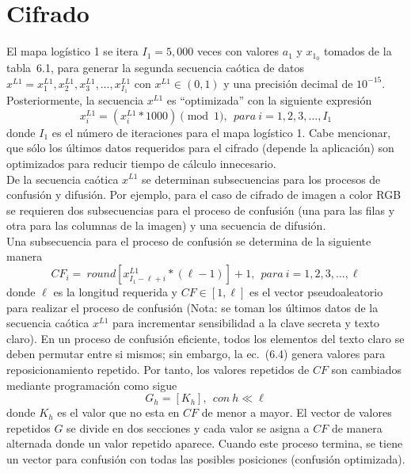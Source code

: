 \section{Cifrado}
El mapa logístico 1 se itera $I_{1}=5,000$ veces con valores $a_{1}$ y $x_{1_{0}}$ tomados de la tabla~6.1, para generar la segunda secuencia caótica de datos $x^{L1}={x_{1}^{L1},x_{2}^{L1},x_{3}^{L1},\ldots ,x_{I_{1}}^{L1}}$ con $x^{L1}\in(0,1)$ y una precisión decimal de $10^{-15}$. Posteriormente, la secuencia  $x^{L1}$  es ``optimizada'' con la siguiente expresión
\begin{equation}
x_{i}^{L1}=\left(x_{i}^{L1}\ast 1000\right)\pmod 1, ~~  para ~i=1,2,3,\ldots,I_{1}
\end{equation}  
donde $I_{1}$ es el número de iteraciones para el mapa logístico 1. Cabe mencionar, que sólo los últimos datos requeridos para el cifrado (depende la aplicación) son optimizados para reducir tiempo de cálculo innecesario.\\

De la secuencia caótica $x^{L1}$ se determinan subsecuencias para los procesos de confusión y difusión. Por ejemplo, para el caso de cifrado de imagen a color RGB se requieren dos subsecuencias para el proceso de confusión (una para las filas y otra para las columnas de la imagen) y una secuencia de difusión. \\

Una subsecuencia para el proceso de confusión se determina de la siguiente manera
\begin{equation}
CF_{i}=~round\left[ x_{I_{1}-\ell +i}^{L1}\ast (\ell-1)\right]+1, ~~  para ~i=1,2,3,\ldots ,\ell  
\end{equation} 
donde $\ell$ es la longitud requerida y $CF\in \left[1,\ell \right]$ es el vector pseudoaleatorio para realizar el proceso de confusión (Nota: se toman los últimos datos de la secuencia caótica $x^{L1}$ para incrementar sensibilidad a la clave secreta y texto claro). En un proceso de confusión eficiente, todos los elementos del texto claro se deben permutar entre si mismos; sin embargo, la ec.~(6.4) genera valores para reposicionamiento repetido. Por tanto, los valores repetidos de $CF$ son cambiados mediante programación como sigue 
\begin{equation}
G_{h}=\left[ K_{h} \right], ~~ con ~h\ll \ell 
\end{equation}
donde $K_{h}$ es el valor que no esta en $CF$ de menor a mayor. El vector de valores repetidos $G$ se divide en dos secciones y cada valor se asigna a $CF$ de manera alternada donde un valor repetido aparece. Cuando este proceso termina, se tiene un vector para confusión con todas las posibles posiciones (confusión optimizada). \\


